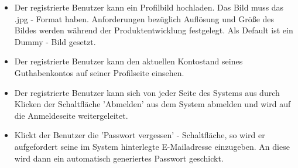 \documentclass[a4paper]{scrreprt}
\begin{document}
\begin{itemize}
				\item {}
					Der registrierte Benutzer kann ein Profilbild hochladen. Das Bild muss das .jpg - Format haben. Anforderungen bezüglich Auflösung und Größe des Bildes werden während der Produktentwicklung festgelegt. Als Default ist ein \gls{Dummy} - Bild gesetzt.
				\item {}
					Der registrierte Benutzer kann den aktuellen Kontostand seines Guthabenkontos auf seiner Profilseite einsehen. 
				\item {}
					Der registrierte Benutzer kann sich  von jeder Seite des Systems aus durch Klicken der Schaltfläche 'Abmelden' aus dem System abmelden und wird auf die Anmeldeseite weitergeleitet.
				\item {}
					Klickt der Benutzer die 'Passwort vergessen' - Schaltfläche, so wird er aufgefordert seine im System hinterlegte E-Mailadresse einzugeben. An diese wird dann ein automatisch generiertes Passwort geschickt.
			\end{itemize}	
\end{document}
